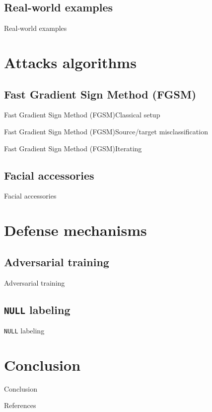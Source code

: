 \documentclass[aspectratio=169]{beamer}
\theoremstyle{definition}
\begin{document}
\subsection{Real-world examples}
\begin{frame}{Real-world examples}
  
\end{frame}

\section{Attacks algorithms}
\subsection{Fast Gradient Sign Method (FGSM)}
\begin{frame}{Fast Gradient Sign Method (FGSM)}{Classical setup}
  
\end{frame}

\begin{frame}{Fast Gradient Sign Method (FGSM)}{Source/target misclassification}
  
\end{frame}

\begin{frame}{Fast Gradient Sign Method (FGSM)}{Iterating}
  
\end{frame}

\subsection{Facial accessories}
\begin{frame}{Facial accessories}
  
\end{frame}

\section{Defense mechanisms}
\subsection{Adversarial training}
\begin{frame}{Adversarial training}
  
\end{frame}

\subsection{\texttt{NULL} labeling}
\begin{frame}{\texttt{NULL} labeling}
  
\end{frame}

\section{Conclusion}
\begin{frame}{Conclusion}

\end{frame}


\begin{frame}[allowframebreaks]{References}
    \nocite{*}
    \printbibliography
\end{frame}
\end{document}
